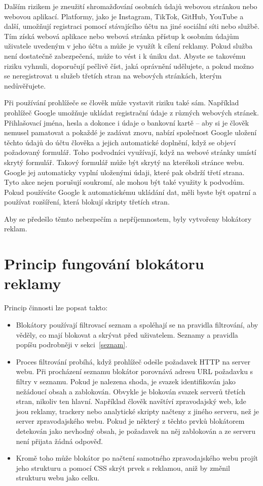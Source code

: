 Dalším rizikem je zneužití shromažďování osobních údajů webovou stránkou nebo webovou aplikací. Platformy, jako je Instagram, TikTok, GitHub, YouTube a další, umožňují registraci pomocí stávajícího účtu na jiné sociální síti nebo službě. Tím získá webová aplikace nebo webová stránka přístup k osobním údajům uživatele uvedeným v jeho účtu a může je využít k cílení reklamy. Pokud služba není dostatečně zabezpečená, může to vést i k úniku dat. Abyste se takovému riziku vyhnuli, doporučují pečlivě číst, jaká oprávnění udělujete, a pokud možno se neregistrovat u služeb třetích stran na webových stránkách, kterým nedůvěřujete.

Při používání prohlížeče se člověk může vystavit riziku také sám. Například prohlížeč Google umožňuje ukládat registrační údaje z různých webových stránek. Přihlašovací jména, hesla  a dokonce i údaje o bankovní kartě -- aby si je člověk nemusel pamatovat a pokaždé je zadávat znovu, nabízí společnost Google uložení těchto údajů do účtu člověka a jejich automatické doplnění, když se objeví požadovaný formulář. Toho podvodníci využívají, když na webové stránky umístí skrytý formulář. Takový formulář může být skrytý na kterékoli stránce webu. Google jej automaticky vyplní uloženými údaji, které pak obdrží třetí strana. Tyto akce nejen porušují soukromí, ale mohou být také využity k podvodům. Pokud používáte Google k automatickému ukládání dat, měli byste být opatrní a používat rozšíření, která blokují skripty třetích stran. 

Aby se předešlo těmto nebezpečím a nepříjemnostem, byly vytvořeny blokátory reklam.


\section{Princip fungování blokátoru reklamy}
Princip činnosti lze popsat takto:
\begin{itemize}
  \item{ Blokátory používají filtrovací seznam a spoléhají se na pravidla filtrování, aby věděly, co mají blokovat a skrývat před uživatelem. Seznamy a pravidla popíšu podrobněji v sekci~\ref{seznam}.}
  \item{Proces filtrování probíhá, když prohlížeč odešle požadavek HTTP na server webu. Při procházení seznamu blokátor porovnává adresu URL požadavku s filtry v seznamu. Pokud je nalezena shoda, je svazek identifikován jako nežádoucí obsah a zablokován. Obvykle je blokován svazek serverů třetích stran, nikoliv ten hlavní. Například člověk navštíví zpravodajský web, kde jsou reklamy, trackery nebo analytické skripty načteny z jiného serveru, než je server zpravodajského webu. Pokud je některý z těchto prvků blokátorem detekován jako nevhodný obsah, je požadavek na něj zablokován a ze serveru není přijata žádná odpověď.}
  \item{Kromě toho může blokátor po načtení samotného zpravodajského webu projít jeho strukturu a pomocí CSS skrýt prvek s reklamou, aniž by změnil strukturu webu jako celku. }
\end{itemize}

